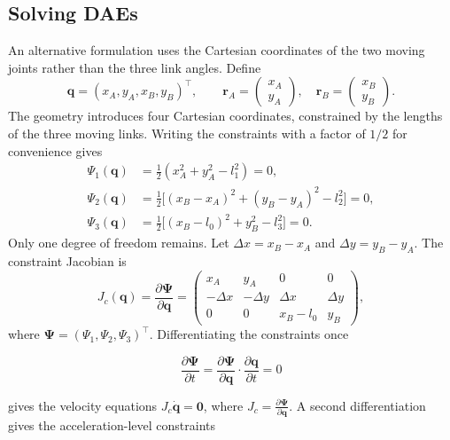 \subsection{Solving DAEs}
\label{subsec:fourbar_dae}

An alternative formulation uses the Cartesian coordinates of the two moving joints rather than the three link angles. Define
\begin{equation}
    \mathbf q=(x_A,y_A,x_B,y_B)^\top,
    \qquad
    \mathbf r_A=\begin{pmatrix}x_A\\y_A\end{pmatrix},\quad
    \mathbf r_B=\begin{pmatrix}x_B\\y_B\end{pmatrix}.
\end{equation}
The geometry introduces four Cartesian coordinates, constrained by the lengths of the three moving links. Writing the constraints with a factor of $1/2$ for convenience gives
\begin{align}
    \Psi_1(\mathbf q)&=\frac12(x_A^2+y_A^2-l_1^2)=0,\\
    \Psi_2(\mathbf q)&=\frac12\bigl[(x_B-x_A)^2+(y_B-y_A)^2-l_2^2\bigr]=0,\\
    \Psi_3(\mathbf q)&=\frac12\bigl[(x_B-l_0)^2+y_B^2-l_3^2\bigr]=0.
    \label{eq:fourbar_cartesian_constraints}
\end{align}
Only one degree of freedom remains. Let $\Delta x=x_B-x_A$ and $\Delta y=y_B-y_A$. The constraint Jacobian is
\begin{equation}
    J_c(\mathbf q)=\frac{\partial\boldsymbol\Psi}{\partial\mathbf q}
    =\begin{pmatrix}
      x_A&y_A&0&0\\
      -\Delta x&-\Delta y&\Delta x&\Delta y\\
      0&0&x_B-l_0&y_B
    \end{pmatrix},
\end{equation}
where $\boldsymbol\Psi=(\Psi_1,\Psi_2,\Psi_3)^\top$. Differentiating the constraints once 

\begin{equation}
    \frac{\partial \mathbf \Psi}{\partial t} =
    \frac{\partial \mathbf \Psi}{\partial \mathbf q} \cdot \frac{\partial \mathbf q}{\partial t} = 0
\end{equation}

gives the velocity equations $J_c\dot{\mathbf q}=\mathbf0$, where $J_c = \frac{\partial \mathbf \Psi}{\partial \mathbf q}$.
A second differentiation gives the acceleration-level constraints

